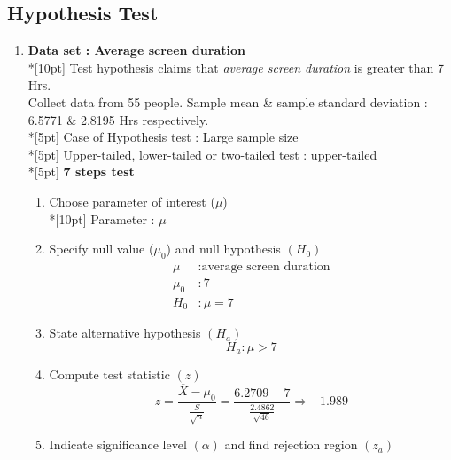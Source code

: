 \subsection*{Hypothesis Test}
\begin{enumerate}
    \item \textbf{Data set : Average screen duration}\\*[10pt]
        Test hypothesis claims that \textit{average screen duration} is greater than 7 Hrs.\\
        Collect data from 55 people. Sample mean & sample standard deviation : 6.5771 \& 2.8195 Hrs respectively.\\*[5pt]
        Case of Hypothesis test : Large sample size\\*[5pt]
        Upper-tailed, lower-tailed or two-tailed test : upper-tailed\\*[5pt]
        \textbf{7 steps test}
        \begin{enumerate}[label=1.\arabic*]
            \item Choose parameter of interest (\(\mu\))\\*[10pt]
                Parameter : \(\mu\)
            \item Specify null value (\(\mu_0\)) and null hypothesis \((H_0)\)\\
            \begin{equation}
                \begin{split}
                    \mu &: \textrm{average screen duration}\\
                    \mu_0 &: 7\\
                    H_0 &: \mu = 7
                \end{split}
            \end{equation}
            \item State alternative hypothesis \((H_a)\)
            \begin{equation}
                H_a : \mu > 7
            \end{equation}
            \item Compute test statistic \((z)\)
            \begin{equation}
                    z = \dfrac{\overline{X}-\mu_0}{\frac{S}{\sqrt{n}}} = \dfrac{6.2709-7}{\frac{2.4862}{\sqrt{46}}} \Rightarrow -1.989
            \end{equation}
            \item Indicate significance level \((\alpha)\) and find rejection region \((z_a)\)

\end{enumerate}
\end{enumerate}
